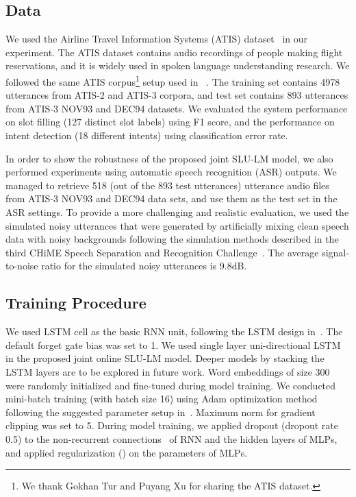 \documentclass[11pt]{article}
\begin{document}
\subsection{Data}
    We used the Airline Travel Information Systems (ATIS) dataset~\cite{hemphill:90} in our experiment. The ATIS dataset contains audio recordings of people making flight reservations, and it is widely used in spoken language understanding research. We followed the same ATIS corpus\footnote{We thank Gokhan Tur and Puyang Xu for sharing the ATIS dataset.} setup used in ~\cite{mesnil:15,xu:13,tur:10}. The training set contains 4978 utterances from ATIS-2 and ATIS-3 corpora, and test set contains 893 utterances from ATIS-3 NOV93 and DEC94 datasets. We evaluated the system performance on slot filling (127 distinct slot labels) using F1 score, and the performance on intent detection (18 different intents) using classification error rate. 
    
    In order to show the robustness of the proposed joint SLU-LM model, we also performed experiments using automatic speech recognition (ASR) outputs. We managed to retrieve 518 (out of the 893 test utterances) utterance audio files from ATIS-3 NOV93 and DEC94 data sets, and use them as the test set in the ASR settings. To provide a more challenging and realistic evaluation, we used the simulated noisy utterances that were generated by artificially mixing clean speech data with noisy backgrounds following the simulation methods described in the third CHiME Speech Separation and Recognition Challenge~\cite{barker:15}. The average signal-to-noise ratio for the simulated noisy utterances is 9.8dB.

\subsection{Training Procedure}    
    We used LSTM cell as the basic RNN unit, following the LSTM design in~\cite{zaremba:14}. The default forget gate bias was set to 1. We used single layer uni-directional LSTM in the proposed joint online SLU-LM model. Deeper models by stacking the LSTM layers are to be explored in future work. Word embeddings of size 300 were randomly initialized and fine-tuned during model training. We conducted mini-batch training (with batch size 16) using Adam optimization method following the suggested parameter setup in~\cite{kingma:14}. Maximum norm for gradient clipping was set to 5. During model training, we applied dropout (dropout rate 0.5) to the non-recurrent connections~\cite{zaremba:14} of RNN and the hidden layers of MLPs, and applied  regularization () on the parameters of MLPs. 
    
\end{document}
